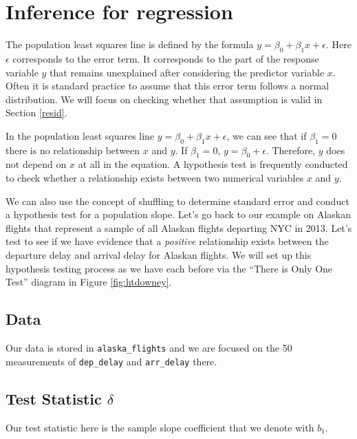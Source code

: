 \documentclass[]{tufte-book}
\begin{document}
\section{Inference for regression}\label{inference-for-regression}

The population least squares line is defined by the formula
\(y = \beta_0 + \beta_1 x + \epsilon\). Here \(\epsilon\) corresponds to
the error term. It corresponds to the part of the response variable
\(y\) that remains unexplained after considering the predictor variable
\(x\). Often it is standard practice to assume that this error term
follows a normal distribution. We will focus on checking whether that
assumption is valid in Section \ref{resid}.

In the population least squares line
\(y = \beta_0 + \beta_1 x + \epsilon\), we can see that if
\(\beta_1 = 0\) there is no relationship between \(x\) and \(y\). If
\(\beta_1 = 0\), \(y = \beta_0 + \epsilon\). Therefore, \(y\) does not
depend on \(x\) at all in the equation. A hypothesis test is frequently
conducted to check whether a relationship exists between two numerical
variables \(x\) and \(y\).

We can also use the concept of shuffling to determine standard error and
conduct a hypothesis test for a population slope. Let's go back to our
example on Alaskan flights that represent a sample of all Alaskan
flights departing NYC in 2013. Let's test to see if we have evidence
that a \emph{positive} relationship exists between the departure delay
and arrival delay for Alaskan flights. We will set up this hypothesis
testing process as we have each before via the ``There is Only One
Test'' diagram in Figure \ref{fig:htdowney}.

\subsection{Data}\label{data-2}

Our data is stored in \texttt{alaska\_flights} and we are focused on the
50 measurements of \texttt{dep\_delay} and \texttt{arr\_delay} there.

\subsection{\texorpdfstring{Test Statistic
\(\delta\)}{Test Statistic \textbackslash{}delta}}\label{test-statistic-delta-2}

Our test statistic here is the sample slope coefficient that we denote
with \(b_1\).
\end{document}
